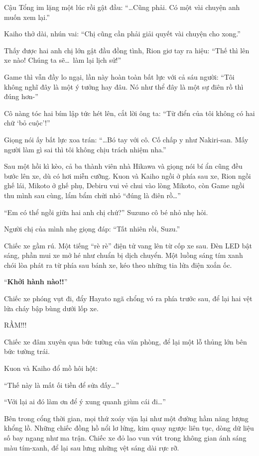 \documentclass[../main.tex]{subfiles}
\begin{document}
Cậu Tổng im lặng một lúc rồi gật đầu: ``\dots Cũng phải. Có một vài chuyện anh muốn xem lại.''

Kaiho thở dài, nhún vai: ``Chị cũng cần phải giải quyết vài chuyện cho xong.''

Thấy được hai anh chị lớn gật đầu đồng tình, Rion giơ tay ra hiệu: ``Thế thì lên xe nào! Chúng ta sẽ\dots\ làm lại lịch sử!''

Game thì vẫn đầy lo ngại, lần này hoàn toàn bất lực với cả sáu người: ``Tôi không nghĩ đây là một ý tưởng hay đâu. Nó như thể đây là một sự điên rồ thì đúng hơn-''

Cô nàng tóc hai bím lập tức hét lên, cắt lời ông ta: ``Từ điển của tôi không có hai chữ `bỏ cuộc'!''

Giọng nói ấy bất lực xoa trán: ``\dots Bó tay với cô. Cố chấp y như Nakiri-san. Mấy người làm gì sai thì tôi không chịu trách nhiệm nha.''

Sau một hồi kì kèo, cả ba thành viên nhà Hikawa và giọng nói bí ẩn cũng đều bước lên xe, dù có hơi miễn cưỡng. Kuon và Kaiho ngồi ở phía sau xe, Rion ngồi ghế lái, Mikoto ở ghế phụ, Debiru vui vẻ chui vào lòng Mikoto, còn Game ngồi thu mình sau cùng, lẩm bẩm chửi nhỏ ``đúng là điên rồ\dots''

``Em có thể ngồi giữa hai anh chị chứ?'' Suzuno cô bé nhỏ nhẹ hỏi.

Người chị của mình nhẹ giọng đáp: ``Tất nhiên rồi, Suzu.''

Chiếc xe gầm rú. Một tiếng ``rè rè'' điện tử vang lên từ cốp xe sau. Đèn LED bật sáng, phần mui xe mở hé như chuẩn bị dịch chuyển. Một luồng sáng tím xanh chói lòa phát ra từ phía sau bánh xe, kéo theo những tia lửa điện xoắn ốc.

``\textbf{Khởi hành nào!!}''

Chiếc xe phóng vụt đi, đẩy Hayato ngã chổng vó ra phía trước sau, để lại hai vệt lửa cháy bập bùng dưới lốp xe.

RẦM!!!

Chiếc xe đâm xuyên qua bức tường của văn phòng, để lại một lỗ thủng lớn bên bức tường trái.


Kuon và Kaiho đổ mồ hôi hột:

``Thế này là mất ối tiền để sửa đấy\dots''

``Với lại ai đó làm ơn để ý xung quanh giùm cái đi\dots''

Bên trong cổng thời gian, mọi thứ xoáy vặn lại như một đường hầm năng lượng khổng lồ. Những chiếc đồng hồ nổi lơ lửng, kim quay ngược liên tục, dòng dữ liệu số bay ngang như ma trận. Chiếc xe đỏ lao vun vút trong không gian ánh sáng màu tím-xanh, để lại sau lưng những vệt sáng dài rực rỡ.
\end{document}
